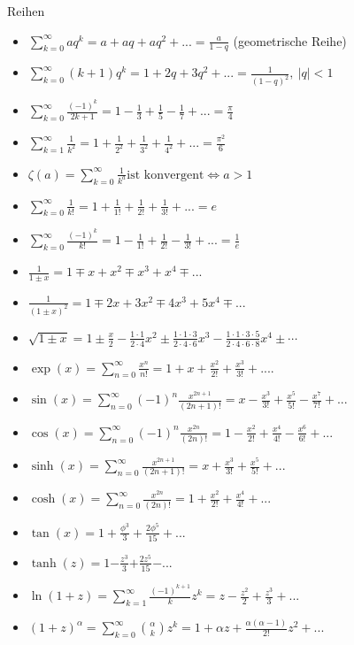 \begin{Rechenregeln}{Reihen}{}
    \begin{itemize}
        \item $\sum_{k=0}^{\infty} aq^{k} = a + aq + aq^{2} +... = \frac{a}{1-q}$ (geometrische Reihe)
        \item $\sum_{k=0}^{\infty} (k+1)q^{k} = 1 + 2q + 3q^{2} +... = \frac{1}{(1-q)^{2}}, \ \vert q \vert < 1$ 
        \item $\sum_{k=0}^{\infty} \frac{(-1)^{k}}{2k+1} = 1 - \frac{1}{3} + \frac{1}{5} - \frac{1}{7} + ... = \frac{\pi}{4}$
        \item $\sum_{k=1}^{\infty} \frac{1}{k^{2}} = 1 + \frac{1}{2^{2}} + \frac{1}{3^{2}} + \frac{1}{4^{2}} + ... = \frac{\pi^{2}}{6}$
        \item $\zeta(a) = \sum_{k=0}^{\infty} \frac{1}{k^{a}} \text{ist konvergent} \iff a>1$
        \item $\sum_{k=0}^{\infty} \frac{1}{k!} = 1+\frac{1}{1!} + \frac{1}{2!} + \frac{1}{3!} + ... = e$
        \item $\sum_{k=0}^{\infty} \frac{(-1)^{k}}{k!} = 1 - \frac{1}{1!} + \frac{1}{2!} - \frac{1}{3!} + ... = \frac{1}{e}$
        \item $\frac{1}{1 \pm x} = 1 \mp x + x^2 \mp x^3 + x^4 \mp ...$
        \item $\frac{1}{(1 \pm x)^2} = 1 \mp 2x + 3x^2 \mp 4x^3 + 5x^4 \mp ...$
        \item $\sqrt{1 \pm x} = 1 \pm \frac{x}{2} - \frac{\scriptstyle{1\cdot 1}}{\scriptstyle{2 \cdot 4}}x^2 \pm \frac{\scriptstyle{1\cdot 1 \cdot 3}}{\scriptstyle{2 \cdot 4 \cdot 6}}x^3 - \frac{\scriptstyle{1 \cdot 1 \cdot 3 \cdot 5}}{\scriptstyle{2 \cdot 4 \cdot 6 \cdot 8}}x^4 \pm \scriptstyle\cdots$
        \item $\exp(x) = \sum_{n=0}^{\infty} \frac{x^{n}}{n!} = 1 + x + \frac{x^{2}}{2!} + \frac{x^{3}}{3!} + ....$
        \item $\sin(x) =  \sum_{n=0}^{\infty} (-1)^{n}\frac{x^{2n+1}}{(2n +1)!} = x - \frac{x^{3}}{3!} + \frac{x^{5}}{5!} - \frac{x^{7}}{7!} + ...$ 
        \item $\cos(x) =  \sum_{n=0}^{\infty} (-1)^{n}\frac{x^{2n}}{(2n)!} = 1 - \frac{x^{2}}{2!} + \frac{x^{4}}{4!} - \frac{x^{6}}{6!} + ...$ 
        \item $\sinh(x) = \sum_{n=0}^{\infty} \frac{x^{2n+1}}{(2n+1)!} = x + \frac{x^3}{3!} + \frac{x^5}{5!} + ...$
        \item $\cosh(x) = \sum_{n=0}^{\infty} \frac{x^{2n}}{(2n)!} = 1 + \frac{x^2}{2!} + \frac{x^4}{4!} + ...$
        \item $\tan(x) = 1 + \frac{\phi^3}{3} + \frac{2\phi^5}{15} + ...$
        \item $\tanh(z) = 1 \pmb{-} \frac{z^3}{3} \pmb{+} \frac{2z^5}{15} \pmb{-} ...$
        \item $\ln(1+z) = \sum_{k=1}^{\infty} \frac{(-1)^{k+1}}{k}z^k = z - \frac{z^2}{2} + \frac{z^3}{3} + ...$
        \item $(1+z)^\alpha = \sum_{k=0}^{\infty}  \binom{\alpha}{k} z^k = 1 + \alpha z + \frac{\alpha(\alpha - 1)}{2!} z ^ 2 + ...$
    \end{itemize}
\end{Rechenregeln}

